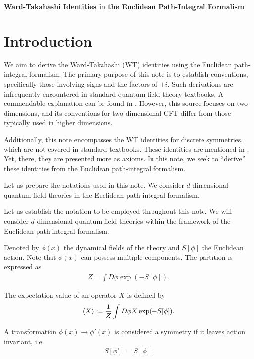 \documentclass[12pt]{scrartcl}
\begin{document}
\begin{center}
{\bfseries \sffamily \LARGE Ward-Takahashi Identities in the Euclidean Path-Integral Formalism}  \\

\vspace{0.5cm}
\end{center}

\section{Introduction}
We aim to derive the Ward-Takahashi (WT) identities using the Euclidean path-integral formalism. The primary purpose of this note is to establish conventions, specifically those involving signs and the factors of $\pm i$. Such derivations are infrequently encountered in standard quantum field theory textbooks. A commendable explanation can be found in \cite{Polchinski:1998rq}. However, this source focuses on two dimensions, and its conventions for two-dimensional CFT differ from those typically used in higher dimensions.

Additionally, this note encompasses the WT identities for discrete symmetries, which are not covered in standard textbooks. These identities are mentioned in \cite{Gaiotto:2014kfa}. Yet, there, they are presented more as axioms. In this note, we seek to ``derive'' these identities from the Euclidean path-integral formalism.

Let us prepare the notations used in this note.  We consider $d$-dimensional quantum field theories in the Euclidean path-integral formalism.

Let us establish the notation to be employed throughout this note. We will consider $d$-dimensional quantum field theories within the framework of the Euclidean path-integral formalism.

Denoted by $\phi(x)$ the dynamical fields of the theory and $S[\phi]$ the Euclidean action. Note that $\phi(x)$ can possess multiple components.  The partition is expressed as
\begin{align}
    Z=\int D\phi \exp(-S[\phi]).
\end{align}

The expectation value of an operator $X$ is defined by
\begin{align}
    \expval{X}:=\frac{1}{Z}\int D\phi X \exp(-S[\phi]).
\end{align}

A transformation $\phi(x)\to \phi'(x)$ is considered a symmetry if it leaves action invariant, i.e.
\begin{align}
    S[\phi']=S[\phi].
\end{align}
\end{document}
